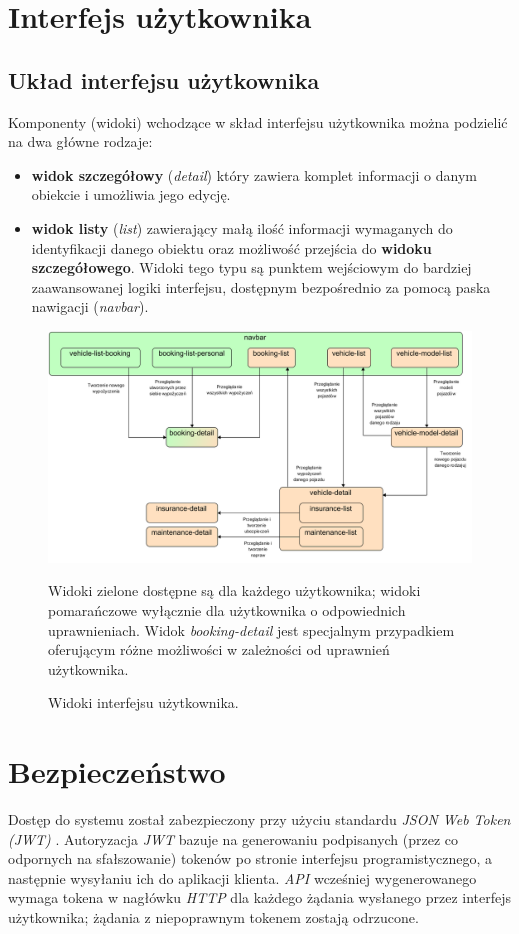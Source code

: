 \documentclass[eng,printmode,openany]{mgr}
\begin{document}
	
	\newpage
	
	
	
	\section{Interfejs użytkownika}
	\subsection{Układ interfejsu użytkownika}
	Komponenty (widoki) wchodzące w skład interfejsu użytkownika można podzielić na dwa główne rodzaje:
	\begin{itemize}
		\item \textbf{widok szczegółowy} (\textit{detail}) który zawiera komplet informacji o danym obiekcie i umożliwia jego edycję.
		\item \textbf{widok listy} (\textit{list}) zawierający małą ilość informacji wymaganych do identyfikacji danego obiektu oraz możliwość przejścia do \textbf{widoku szczegółowego}. Widoki tego typu są punktem wejściowym do bardziej zaawansowanej logiki interfejsu, dostępnym bezpośrednio za pomocą paska nawigacji (\textit{navbar}).
	\end{itemize}
	\begin{figure}[h]
		\centering
		\includegraphics[scale=0.62]{images/angular_views.png}
		\caption{Widoki interfejsu użytkownika.}
		\small 
		Widoki zielone dostępne są dla każdego użytkownika; widoki pomarańczowe wyłącznie dla użytkownika o odpowiednich uprawnieniach. Widok \textit{booking-detail} jest specjalnym przypadkiem oferującym różne możliwości w zależności od uprawnień użytkownika.
	\end{figure}
	
	\section{Bezpieczeństwo}
	Dostęp do systemu został zabezpieczony przy użyciu standardu \textit{JSON Web Token (JWT)} \cite{jwt}. Autoryzacja \textit{JWT} bazuje na generowaniu podpisanych (przez co odpornych na sfałszowanie) tokenów po stronie interfejsu programistycznego, a następnie wysyłaniu ich do aplikacji klienta. \textit{API} wcześniej wygenerowanego wymaga tokena w nagłówku \textit{HTTP} dla każdego żądania wysłanego przez interfejs użytkownika; żądania z niepoprawnym tokenem zostają odrzucone.
	
\end{document}
